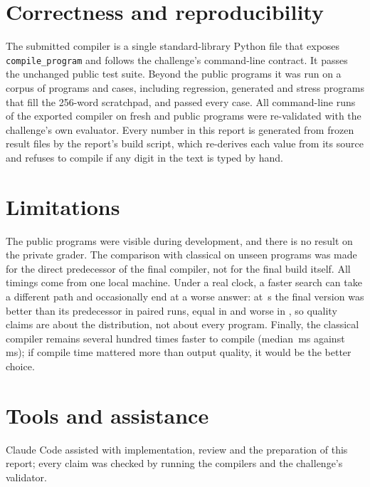 \documentclass[11pt,a4paper]{article}
\begin{document}
\section{Correctness and reproducibility}\label{sec:correct}

The submitted compiler is a single standard-library Python file that exposes
\texttt{compile\_program} and follows the challenge's command-line contract. It
passes the unchanged public test suite. Beyond the public programs it was run on a
corpus of  programs and  cases, including regression,
generated and stress programs that fill the 256-word scratchpad, and passed every
case. All  command-line runs of the
exported compiler on fresh and public programs were re-validated with the challenge's
own evaluator. Every number in this report is generated from frozen result files by
the report's build script, which re-derives each value from its source and refuses
to compile if any digit in the text is typed by hand.

\section{Limitations}\label{sec:limits}

The public programs were visible during development, and there is no result on the
private grader. The comparison with classical on unseen programs was made for the
direct predecessor of the final compiler, not for the final build itself. All timings come
from one local machine. Under a real clock, a faster search can take a different
path and occasionally end at a worse answer: at \,s the final version was better
than its predecessor in  paired runs, equal in  and worse in
, so quality claims are about the distribution, not about every program.
Finally, the classical compiler remains several hundred times faster to compile
(median \,ms against \,ms); if
compile time mattered more than output quality, it would be the better choice.

\section*{Tools and assistance}
Claude Code assisted with implementation, review and the preparation of this report;
every claim was checked by running the compilers and the challenge's validator.
\end{document}
